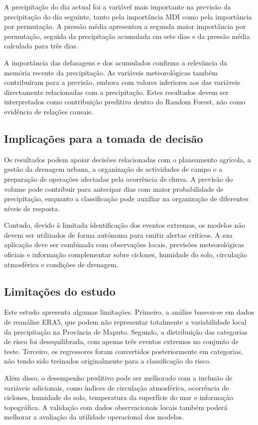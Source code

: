 \documentclass[9pt,twocolumn,twoside,english,portuguese]{opticajnl}
\begin{document}
A precipitação do dia actual foi a variável mais importante na previsão da
precipitação do dia seguinte, tanto pela importância MDI como pela
importância por permutação. A pressão média apresentou a segunda maior
importância por permutação, seguida da precipitação acumulada em sete dias e
da pressão média calculada para três dias.

A importância das defasagens e dos acumulados confirma a relevância da
memória recente da precipitação. As variáveis meteorológicas também
contribuíram para a previsão, embora com valores inferiores aos das
variáveis directamente relacionadas com a precipitação. Estes resultados
devem ser interpretados como contribuição preditiva dentro do Random Forest,
não como evidência de relações causais.

\subsection{Implicações para a tomada de decisão}

Os resultados podem apoiar decisões relacionadas com o planeamento
agrícola, a gestão da drenagem urbana, a organização de actividades de
campo e a preparação de operações afectadas pela ocorrência de chuva. A
previsão do volume pode contribuir para antecipar dias com maior
probabilidade de precipitação, enquanto a classificação pode auxiliar na
organização de diferentes níveis de resposta.

Contudo, devido à limitada identificação dos eventos extremos, os modelos
não devem ser utilizados de forma autónoma para emitir alertas críticos.
A sua aplicação deve ser combinada com observações locais, previsões
meteorológicas oficiais e informação complementar sobre ciclones,
humidade do solo, circulação atmosférica e condições de drenagem.

\subsection{Limitações do estudo}
Este estudo apresenta algumas limitações. Primeiro, a análise baseou-se em dados de reanálise ERA5, que podem não representar totalmente a
variabilidade local da precipitação na Província de Maputo. Segundo, a distribuição das categorias de risco foi desequilibrada, com apenas três
eventos extremos no conjunto de teste. Terceiro, os regressores foram convertidos posteriormente em categorias, não tendo sido treinados originalmente para a classificação do risco.

Além disso, o desempenho preditivo pode ser melhorado com a inclusão de variáveis adicionais, como índices de circulação atmosférica, ocorrência de
ciclones, humidade do solo, temperatura da superfície do mar e informação
topográfica. A validação com dados observacionais locais também poderá
melhorar a avaliação da utilidade operacional dos modelos.
\end{document}
